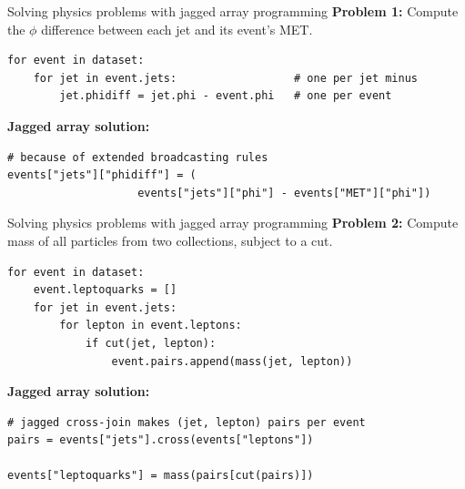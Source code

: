 \documentclass[aspectratio=169]{beamer}
\begin{document}
\begin{frame}[fragile]{Solving physics problems with jagged array programming}
\vspace{0.5 cm}
{\bf Problem 1:} Compute the $\phi$ difference between each jet and its event's MET.
\small
\begin{verbatim}
for event in dataset:
    for jet in event.jets:                  # one per jet minus
        jet.phidiff = jet.phi - event.phi   # one per event
\end{verbatim}
\normalsize

\vspace{0.5 cm}
{\bf Jagged array solution:} 
\small
\begin{verbatim}
# because of extended broadcasting rules
events["jets"]["phidiff"] = (
                    events["jets"]["phi"] - events["MET"]["phi"])
\end{verbatim}
\end{frame}

\begin{frame}[fragile]{Solving physics problems with jagged array programming}
\vspace{0.5 cm}
{\bf Problem 2:} Compute mass of all particles from two collections, subject to a cut.
\small
\begin{verbatim}
for event in dataset:
    event.leptoquarks = []
    for jet in event.jets:
        for lepton in event.leptons:
            if cut(jet, lepton):
                event.pairs.append(mass(jet, lepton))
\end{verbatim}
\normalsize

\vspace{0.5 cm}
{\bf Jagged array solution:} 
\small
\begin{verbatim}
# jagged cross-join makes (jet, lepton) pairs per event
pairs = events["jets"].cross(events["leptons"])

events["leptoquarks"] = mass(pairs[cut(pairs)])
\end{verbatim}
\end{frame}
\end{document}
